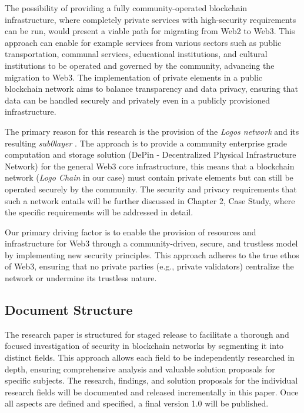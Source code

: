 The possibility of providing a fully community-operated blockchain infrastructure, where completely private services with high-security requirements can be run, would present a viable path for migrating from Web2 to Web3. This approach can enable for example services from various sectors such as public transportation, communal services, educational institutions, and cultural institutions to be operated and governed by the community, advancing the migration to Web3. The implementation of private elements in a public blockchain network aims to balance transparency and data privacy, ensuring that data can be handled securely and privately even in a publicly provisioned infrastructure.

The primary reason for this research is the provision of the \textit{Logos network} \cite{AboutLogosNetworkDocs} and its resulting \textit{sub0layer} \cite{sub0layerBlog}. The approach is to provide a community enterprise grade computation and storage solution (DePin - Decentralized Physical Infrastructure Network) for the general Web3 core infrastructure, this means that a blockchain network (\textit{Logo Chain} in our case) must contain private elements but can still be operated securely by the community. The security and privacy requirements that such a network entails will be further discussed in Chapter 2, Case Study, where the specific requirements will be addressed in detail.

Our primary driving factor is to enable the provision of resources and infrastructure for Web3 through a community-driven, secure, and trustless model by implementing new security principles. This approach adheres to the true ethos of Web3, ensuring that no private parties (e.g., private validators) centralize the network or undermine its trustless nature.   

\subsection{Document Structure}
The research paper is structured for staged release to facilitate a thorough and focused investigation of security in blockchain networks by segmenting it into distinct fields. This approach allows each field to be independently researched in depth, ensuring comprehensive analysis and valuable solution proposals for specific subjects. The research, findings, and solution proposals for the individual research fields will be documented and released incrementally in this paper. Once all aspects are defined and specified, a final version 1.0 will be published.

